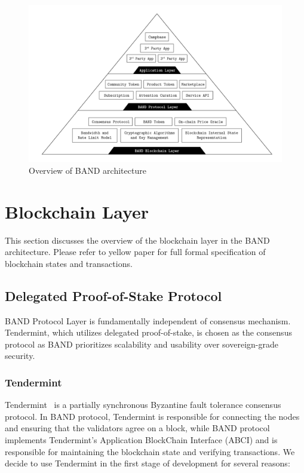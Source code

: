 \documentclass[letterpaper,11pt]{article}
\begin{document}
\begin{figure}[h]
    \centering
    \includegraphics[width=1.05\textwidth]{figures/pyramid}
    \caption{Overview of BAND architecture}
    \label{fig:pyramid}
\end{figure}

\clearpage
\newpage

\section{Blockchain Layer} \label{sec:blockchain-layer}
This section discusses the overview of the blockchain layer in the BAND architecture. Please refer to yellow paper for full formal specification of blockchain states and transactions.

\subsection{Delegated Proof-of-Stake Protocol} \label{sec:dPOS}
BAND Protocol Layer is fundamentally independent of consensus mechanism. Tendermint, which utilizes delegated proof-of-stake, is chosen as the consensus protocol as BAND prioritizes scalability and usability over sovereign-grade security.

\subsubsection{Tendermint}
Tendermint~\cite{kwon2014tendermint} is a partially synchronous Byzantine fault tolerance consensus protocol. In BAND protocol, Tendermint is responsible for connecting the nodes and ensuring that the validators agree on a block, while BAND protocol implements Tendermint's Application BlockChain Interface (ABCI) and is responsible for maintaining the blockchain state and verifying transactions. We decide to use Tendermint in the first stage of development for several reasons:
\end{document}

